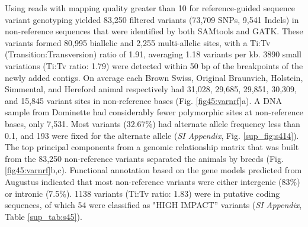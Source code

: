 \documentclass[../main.tex]{subfiles}
\begin{document}
Using reads with mapping quality greater than 10 for reference-guided sequence variant genotyping yielded 83,250 filtered variants (73,709 SNPs, 9,541 Indels) in non-reference sequences that were identified by both SAMtools and GATK. These variants formed 80,995 biallelic and 2,255 multi-allelic sites, with a Ti:Tv (Transition:Transversion) ratio of 1.91, averaging 1.18 variants per kb. 3890 small variations (Ti:Tv ratio: 1.79) were detected within 50 bp of the breakpoints of the newly added contigs. On average each Brown Swiss, Original Braunvieh, Holstein, Simmental, and Hereford animal respectively had 31,028, 29,685, 29,851, 30,309, and 15,845 variant sites in non-reference bases (Fig. \ref{fig45:varnrf}a). A DNA sample from Dominette had considerably fewer polymorphic sites at non-reference bases, only 7,531. Most variants (32.67\%) had alternate allele frequency less than 0.1, and 193 were fixed for the alternate allele (\emph{SI Appendix}, Fig. \ref{sup_fig:s414}). The top principal components from a genomic relationship matrix that was built from the 83,250 non-reference variants separated the animals by breeds (Fig. \ref{fig45:varnrf}b,c). Functional annotation based on the gene models predicted from Augustus indicated that most non-reference variants were either intergenic (83\%) or intronic (7.5\%). 1138 variants (Ti:Tv ratio: 1.83) were in putative coding sequences, of which 54 were classified as "HIGH IMPACT” variants (\emph{SI Appendix}, Table \ref{sup_tab:s45}).
\end{document}
